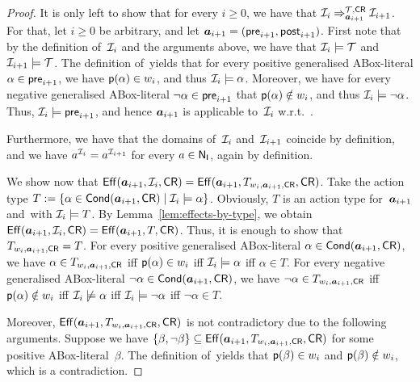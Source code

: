 \begin{proof}
    It is only left to show that for every $i\ge 0$, we have that
    $\mathcal{I}_i\Rightarrow_{\boldsymbol a_{i+1}}^{\mathcal{T},\mathsf{CR}}\mathcal{I}_{i+1}$.  For that, let
    $i\ge 0$ be arbitrary, and let $\boldsymbol a_{i+1}=(\mathsf{pre}_{i+1},\mathsf{post}_{i+1})$.
    First note that by the definition of~$\mathcal{I}_i$ and the arguments above, we
    have that $\mathcal{I}_i\models\mathcal{T}$ and $\mathcal{I}_{i+1}\models\mathcal{T}$.
    The definition of~\Deltah yields that for every positive generalised
    ABox-literal $\alpha\in\mathsf{pre}_{i+1}$, we have $\mathsf{p}(\alpha)\in w_i$, and thus
    $\mathcal{I}_i\models\alpha$.  Moreover, we have for every negative generalised
    ABox-literal $\lnot\alpha\in\mathsf{pre}_{i+1}$ that $\mathsf{p}(\alpha)\notin w_i$, and
    thus $\mathcal{I}_i\models\lnot\alpha$.  Thus, $\mathcal{I}_i\models\mathsf{pre}_{i+1}$, and hence
    $\boldsymbol a_{i+1}$ is applicable to~$\mathcal{I}_i$ w.r.t.~\Tmc.

    Furthermore, we have that the domains of~$\mathcal{I}_i$ and~$\mathcal{I}_{i+1}$ coincide
    by definition, and we have $a^{\mathcal{I}_i}=a^{\mathcal{I}_{i+1}}$ for every $a\in\mathsf{N_I}$,
    again by definition.

    We show now that
    $\operatorname{\mathsf{Eff}}(\boldsymbol a_{i+1},\mathcal{I}_i,\mathsf{CR})=\operatorname{\mathsf{Eff}}(\boldsymbol a_{i+1},T_{w_i,\boldsymbol a_{i+1},\mathsf{CR}},\mathsf{CR})$.
    Take the action type
    $T:=\{\alpha\in\operatorname{\mathsf{Cond}}(\boldsymbol a_{i+1},\mathsf{CR})\mid\mathcal{I}_i\models\alpha\}$.  Obviously,
    $T$ is an action type for~$\boldsymbol a_{i+1}$ and~\CR with $\mathcal{I}_i\models T$.  By
    Lemma~\ref{lem:effects-by-type}, we obtain
    $\operatorname{\mathsf{Eff}}(\boldsymbol a_{i+1},\mathcal{I}_i,\mathsf{CR})=\operatorname{\mathsf{Eff}}(\boldsymbol a_{i+1},T,\mathsf{CR})$.  Thus, it is enough to
    show that $T_{w_i,\boldsymbol a_{i+1},\mathsf{CR}}=T$.  For every positive generalised
    ABox-literal $\alpha\in\operatorname{\mathsf{Cond}}(\boldsymbol a_{i+1},\mathsf{CR})$, we have
    $\alpha\in T_{w_i,\boldsymbol a_{i+1},\mathsf{CR}}$ iff $\mathsf{p}(\alpha)\in w_i$ iff
    $\mathcal{I}_i\models\alpha$ iff $\alpha\in T$.  For every negative generalised
    ABox-literal $\lnot\alpha\in\operatorname{\mathsf{Cond}}(\boldsymbol a_{i+1},\mathsf{CR})$, we have
    $\lnot\alpha\in T_{w_i,\boldsymbol a_{i+1},\mathsf{CR}}$ iff $\mathsf{p}(\alpha)\notin w_i$ iff
    $\mathcal{I}_i\not\models\alpha$ iff $\mathcal{I}_i\models\lnot\alpha$ iff
    $\lnot\alpha\in T$.

    Moreover, $\operatorname{\mathsf{Eff}}(\boldsymbol a_{i+1},T_{w_i,\boldsymbol a_{i+1},\mathsf{CR}},\mathsf{CR})$ is not contradictory
    due to the following arguments.  Suppose we have
    $\{\beta,\lnot\beta\}\subseteq\operatorname{\mathsf{Eff}}(\boldsymbol a_{i+1},T_{w_i,\boldsymbol a_{i+1},\mathsf{CR}},\mathsf{CR})$
    for some positive ABox-literal~$\beta$.  The definition of~\Deltah yields
    that $\mathsf{p}(\beta)\in w_i$ and $\mathsf{p}(\beta)\notin w_i$, which is a
    contradiction.


\end{proof}
